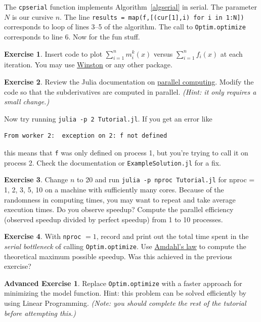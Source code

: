 \documentclass[12pt]{article}
\theoremstyle{definition}
\newtheorem*{advex}{Advanced Exercise}
\newtheorem{ex}{Exercise}
\begin{document}
The \texttt{cpserial} function implements Algorithm~\ref{algserial} in serial. The parameter $N$ is our cursive $n$. The line \texttt{results = map(f,[(cur[1],i) for i in 1:N])} corresponds to loop of lines 3--5 of the algorithm. The call to \texttt{Optim.optimize} corresponds to line 6. Now for the fun stuff.

\begin{ex}
Insert code to plot $\sum_{i=1}^n m_i^k(x)$ versus $\sum_{i=1}^n f_i(x)$ at each iteration. You may use \href{https://github.com/nolta/Winston.jl}{Winston} or any other package.
\end{ex}

\begin{ex}
Review the Julia documentation on \href{http://docs.julialang.org/en/latest/manual/parallel-computing/}{parallel computing}. Modify the code so that the subderivatives are computed in parallel. \textit{(Hint: it only requires a small change.)}
\end{ex}

Now try running \texttt{julia -p 2 Tutorial.jl}. If you get an error like
\begin{center}
\begin{BVerbatim}
From worker 2:	exception on 2: f not defined
\end{BVerbatim}
\end{center}
this means that \texttt{f} was only defined on process 1, but you're trying to call it on process 2. Check the documentation or \texttt{ExampleSolution.jl} for a fix.

\begin{ex}\label{ex:par}
Change $n$ to 20 and run \texttt{julia -p nproc Tutorial.jl} for nproc = 1, 2, 3, 5, 10 on a machine with sufficiently many cores. Because of the randomness in computing times, you may want to repeat and take average execution times. Do you observe speedup? Compute the parallel efficiency (observed speedup divided by perfect speedup) from 1 to 10 processes. 
\end{ex}

\begin{ex}
With \texttt{nproc} $= 1$, record and print out the total time spent in the \textit{serial bottleneck} of calling \texttt{Optim.optimize}. Use \href{http://en.wikipedia.org/wiki/Amdahl's\_law}{Amdahl's law} to compute the theoretical maximum possible speedup. Was this achieved in the previous exercise?
\end{ex}

\begin{advex}
Replace \texttt{Optim.optimize} with a faster approach for minimizing the model function. Hint: this problem can be solved efficiently by using Linear Programming. \textit{(Note: you should complete the rest of the tutorial before attempting this.)}
\end{advex}
\end{document}
